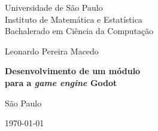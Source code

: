 \thispagestyle{empty}
\begin{center}
    \vspace*{2.3cm}
    Universidade de São Paulo \\
    Instituto de Matemática e Estatística \\
    Bachalerado em Ciência da Computação


    \vspace*{3cm}
    \Large{Leonardo Pereira Macedo}


    \vspace{3cm}
    \textbf{\Large{Desenvolvimento de um módulo \\
    para a \textit{game engine} Godot}}


    \vskip 5cm
    \normalsize{São Paulo}

    \today
\end{center}
